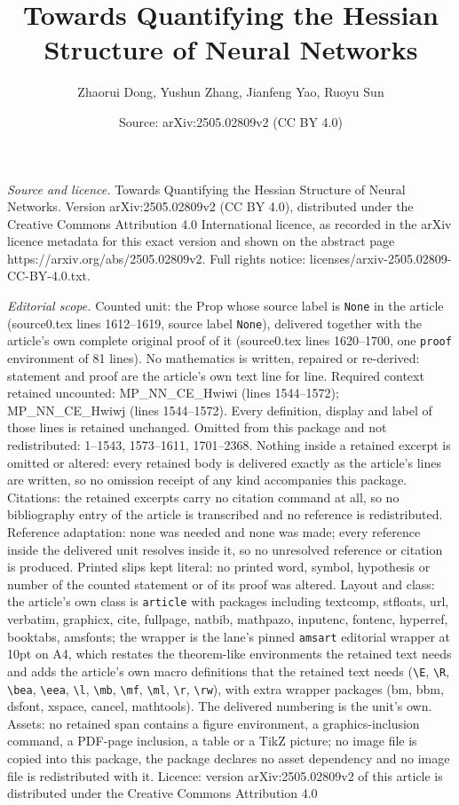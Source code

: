\documentclass[10pt,a4paper]{amsart}
\title[Towards Quantifying the Hessian Structure of Neural Networks]{Towards Quantifying the Hessian Structure of Neural Networks}
\author{Zhaorui Dong, Yushun Zhang, Jianfeng Yao, Ruoyu Sun}
\date{Source: arXiv:2505.02809v2 (CC BY 4.0)}
\begin{document}
\maketitle

\noindent\emph{Source and licence.} Towards Quantifying the Hessian Structure of Neural Networks. Version arXiv:2505.02809v2 (CC BY 4.0), distributed under the Creative Commons Attribution 4.0 International licence, as recorded in the arXiv licence metadata for this exact version and shown on the abstract page https://arxiv.org/abs/2505.02809v2. Full rights notice: licenses/arxiv-2505.02809-CC-BY-4.0.txt.\par\smallskip

\noindent\textit{Editorial scope.} Counted unit: the Prop whose source label is \texttt{None} in the article (source0.tex lines 1612--1619, source label \texttt{None}), delivered together with the article's own complete original proof of it (source0.tex lines 1620--1700, one \texttt{proof} environment of 81 lines). No mathematics is written, repaired or re-derived: statement and proof are the article's own text line for line. Required context retained uncounted: MP\_NN\_CE\_Hwiwi (lines 1544--1572); MP\_NN\_CE\_Hwiwj (lines 1544--1572). Every definition, display and label of those lines is retained unchanged. Omitted from this package and not redistributed: 1--1543, 1573--1611, 1701--2368. Nothing inside a retained excerpt is omitted or altered: every retained body is delivered exactly as the article's lines are written, so no omission receipt of any kind accompanies this package. Citations: the retained excerpts carry no citation command at all, so no bibliography entry of the article is transcribed and no reference is redistributed. Reference adaptation: none was needed and none was made; every reference inside the delivered unit resolves inside it, so no unresolved reference or citation is produced. Printed slips kept literal: no printed word, symbol, hypothesis or number of the counted statement or of its proof was altered. Layout and class: the article's own class is \texttt{article} with packages including textcomp, stfloats, url, verbatim, graphicx, cite, fullpage, natbib, mathpazo, inputenc, fontenc, hyperref, booktabs, amsfonts; the wrapper is the lane's pinned \texttt{amsart} editorial wrapper at 10pt on A4, which restates the theorem-like environments the retained text needs and adds the article's own macro definitions that the retained text needs (\texttt{\textbackslash E}, \texttt{\textbackslash R}, \texttt{\textbackslash bea}, \texttt{\textbackslash eea}, \texttt{\textbackslash l}, \texttt{\textbackslash mb}, \texttt{\textbackslash mf}, \texttt{\textbackslash ml}, \texttt{\textbackslash r}, \texttt{\textbackslash rw}), with extra wrapper packages (bm, bbm, dsfont, xspace, cancel, mathtools). The delivered numbering is the unit's own. Assets: no retained span contains a figure environment, a graphics-inclusion command, a PDF-page inclusion, a table or a TikZ picture; no image file is copied into this package, the package declares no asset dependency and no image file is redistributed with it. Licence: version arXiv:2505.02809v2 of this article is distributed under the Creative Commons Attribution 4.0 
\end{document}
